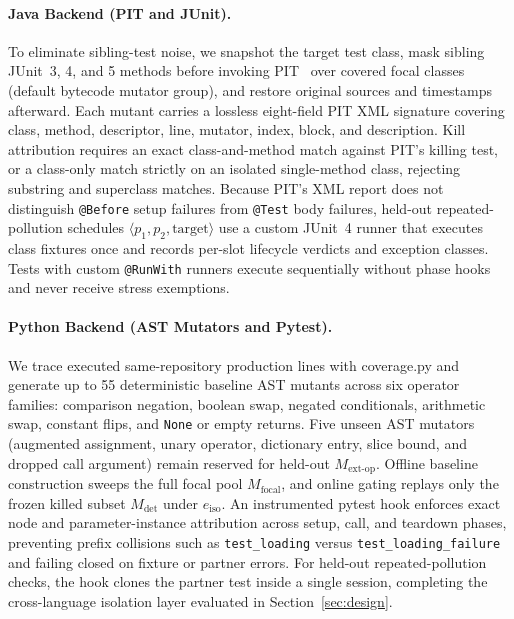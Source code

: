 \paragraph{Java Backend (PIT and JUnit).}
To eliminate sibling-test noise, we snapshot the target test class, mask sibling JUnit~3, 4, and 5 methods before invoking PIT~\cite{coles2016pit} over covered focal classes (default bytecode mutator group), and restore original sources and timestamps afterward. Each mutant carries a lossless eight-field PIT XML signature covering class, method, descriptor, line, mutator, index, block, and description. Kill attribution requires an exact class-and-method match against PIT's killing test, or a class-only match strictly on an isolated single-method class, rejecting substring and superclass matches. Because PIT's XML report does not distinguish \texttt{@Before} setup failures from \texttt{@Test} body failures, held-out repeated-pollution schedules $\langle p_1, p_2, \text{target} \rangle$ use a custom JUnit~4 runner that executes class fixtures once and records per-slot lifecycle verdicts and exception classes. Tests with custom \texttt{@RunWith} runners execute sequentially without phase hooks and never receive stress exemptions.

\paragraph{Python Backend (AST Mutators and Pytest).}
We trace executed same-repository production lines with coverage.py and generate up to 55 deterministic baseline AST mutants across six operator families: comparison negation, boolean swap, negated conditionals, arithmetic swap, constant flips, and \texttt{None} or empty returns. Five unseen AST mutators (augmented assignment, unary operator, dictionary entry, slice bound, and dropped call argument) remain reserved for held-out $M_{\text{ext-op}}$. Offline baseline construction sweeps the full focal pool $M_{\text{focal}}$, and online gating replays only the frozen killed subset $M_{\text{det}}$ under $e_{\text{iso}}$. An instrumented pytest hook enforces exact node and parameter-instance attribution across setup, call, and teardown phases, preventing prefix collisions such as \texttt{test\_loading} versus \texttt{test\_loading\_failure} and failing closed on fixture or partner errors. For held-out repeated-pollution checks, the hook clones the partner test inside a single session, completing the cross-language isolation layer evaluated in Section~\ref{sec:design}.

